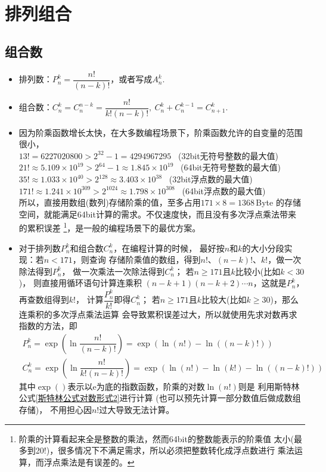 \chapter{排列组合}

\section{组合数}
\begin{itemize}[leftmargin=\inteval{\myitemleftmargin}pt,itemsep=
   \inteval{\myitemitempsep}pt,topsep=\inteval{\myitemtopsep}pt]
   
\item 排列数：$ P_n^k=\dfrac{n!}{(n-k)!} $，或者写成$ A_n^k $. 

\item 组合数：$ C_n^k=C_n^{n-k}=\dfrac{n!}{k!(n-k)!},\ 
C_n^k+C_n^{k-1}=C_{n+1}^k $. 

\item 因为阶乘函数增长太快，在大多数编程场景下，阶乘函数允许的自变量的范围很小，\\
$ 13! = 6227020800 >2^{32}-1 = 4294967295$ \ (32bit无符号整数的最大值)  \\
$ 21!\approx 5.109\times 10^{19} >2^{64}-1 \approx  1.845\times 10^{19}$ 
\ (64bit无符号整数的最大值)   \\
$ 35!\approx 1.033\times 10^{40} >2^{128} \approx  3.403\times 10^{38}$ 
\ (32bit浮点数的最大值)  \\
$ 171!\approx 1.241\times 10^{309} >2^{1024} \approx  1.798\times 10^{308}$ 
\ (64bit浮点数的最大值)  \\
所以，直接用数组(数列)存储阶乘的值，至多占用$ 171\times 8 = 1368 $\,Byte
的存储空间，就能满足64bit计算的需求。不仅速度快，而且没有多次浮点乘法带来
的累积误差
\footnote{阶乘的计算看起来全是整数的乘法，然而64bit的整数能表示的阶乘值
太小(最多到20!)，很多情况下不满足需求，所以必须把整数转化成浮点数进行
乘法运算，而浮点乘法是有误差的。}，是一般的编程场景下的最优方案。

\item 对于排列数$P_n^k$和组合数$C_n^k$，在编程计算的时候，
最好按$n$和$k$的大小分段实现：若$n<171$，则查询
存储阶乘值的数组，得到$n!$、$(n-k)! $、$ k!$，做一次除法得到$P_n^k$，
做一次乘法一次除法得到$C_n^k$；
若$n\geq 171$且$k$比较小(比如$k<30$)，
则直接用循环语句计算连乘积
$(n-k+1)(n-k+2)\cdots n$，这就是$P_n^k$，再查数组得到$k!$，
计算$\dfrac{P_n^k}{k!}$即得$C_n^k$；
若$n\geq 171$且$k$比较大(比如$k\geq 30$)，那么连乘积的多次浮点乘法运算
会导致累积误差过大，所以就使用先求对数再求指数的方法，即
\begin{gather*}
    P_n^k=\exp{\left(\ln \dfrac{n!}{(n-k)!}\right)}=\exp{(\ln(n!)-\ln((n-k)!))} \\
    C_n^k=\exp{\left(\ln \dfrac{n!}{k!(n-k)!}\right)}=\exp{(\ln(n!)-\ln(k!)-\ln((n-k)!))}
\end{gather*}
其中$\exp()$表示以e为底的指数函数，阶乘的对数$\ln(n!)$则是
利用斯特林公式\eqref{斯特林公式对数形式2}进行计算
(也可以预先计算一部分数值后做成数组存储)，
不用担心因$n!$过大导致无法计算。
    

\end{itemize}
